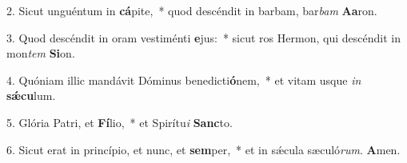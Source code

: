 2. Sicut unguéntum in \textbf{cá}pite,~*  quod descéndit in barbam, bar\textit{bam} \textbf{A}\textbf{a}ron.\

3. Quod descéndit in oram vestiménti \textbf{e}jus:~*  sicut ros Hermon, qui descéndit in mon\textit{tem} \textbf{Si}on.\

4. Quóniam illic mandávit Dóminus benedicti\textbf{ó}nem,~*  et vitam usque \textit{in} \textbf{sǽ}\textbf{cu}lum.\

5. Glória Patri, et \textbf{Fí}lio,~*  et Spirítu\textit{i} \textbf{Sanc}to.\

6. Sicut erat in princípio, et nunc, et \textbf{sem}per,~*  et in sǽcula sæculó\textit{rum}. \textbf{A}men.\

